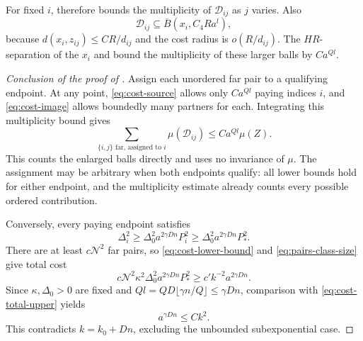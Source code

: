 
For fixed $i$,  therefore bounds the
multiplicity of $\mathcal D_{ij}$ as $j$ varies. Also
\begin{equation}
 \mathcal D_{ij}\subseteq\overline B(x_i,C_4Ra^l),
 \label{eq:cost-source}
\end{equation}
because $d(x_i,z_{ij})\le CR/d_{ij}$ and the cost radius is
$o(R/d_{ij})$. The $HR$-separation of the $x_i$ and
 bound the multiplicity of these larger balls by
$Ca^{Ql}$.

\begin{proof}[Conclusion of the proof of ]
Assign each unordered far pair to a qualifying endpoint. At any point,
\eqref{eq:cost-source} allows only $Ca^{Ql}$ paying indices $i$, and
\eqref{eq:cost-image} allows boundedly many partners for each. Integrating
this multiplicity bound gives
\begin{equation}
 \sum_{\{i,j\}\text{ far, assigned to }i}\mu(\mathcal D_{ij})
 \le Ca^{Ql}\mu(Z).
 \label{eq:cost-total-upper}
\end{equation}
This counts the enlarged balls directly and uses no invariance of $\mu$.
The assignment may be arbitrary when both endpoints qualify: all
lower bounds hold for either endpoint, and the multiplicity estimate
already counts every possible ordered contribution.

Conversely, every paying endpoint satisfies
\[
 \Delta_i^2\ge\Delta_0^2a^{2\gamma Dn}P_i^2
 \ge\Delta_0^2a^{2\gamma Dn}P_*^2.
\]
There are at least $c\mathcal N^2$ far pairs, so
\eqref{eq:cost-lower-bound} and \eqref{eq:pairs-class-size} give total cost
\begin{equation}
 c\mathcal N^2\kappa^2\Delta_0^2a^{2\gamma Dn}P_*^2
 \ge c'k^{-2}a^{2\gamma Dn}.
 \label{eq:cost-total-lower}
\end{equation}
Since $\kappa,\Delta_0>0$ are fixed and
$Ql=QD\lfloor\gamma n/Q\rfloor\le\gamma Dn$, comparison with
\eqref{eq:cost-total-upper} yields
\[
 a^{\gamma Dn}\le Ck^2.
\]
This contradicts $k=k_0+Dn$, excluding the unbounded subexponential case.
\end{proof}
